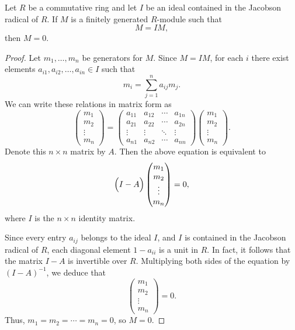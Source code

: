 \documentclass[12pt]{article}
\begin{document}
\begin{lemma}
    
Let $R$ be a commutative ring and let $I$ be an ideal contained in the Jacobson radical of $R$. If $M$ is a finitely generated $R$-module such that
$$
M = I M,
$$
then $M = 0$.

\end{lemma}

\begin{proof}

Let $m_1,\dots,m_n$ be generators for $M$. Since $M = I M$, for each $i$ there exist elements $a_{i1}, a_{i2}, \dots, a_{in} \in I$ such that
$$
m_i = \sum_{j=1}^n a_{ij} m_j.
$$
We can write these relations in matrix form as
$$
\begin{pmatrix}
m_1 \\ m_2 \\ \vdots \\ m_n
\end{pmatrix}
=
\begin{pmatrix}
a_{11} & a_{12} & \cdots & a_{1n} \\
a_{21} & a_{22} & \cdots & a_{2n} \\
\vdots & \vdots & \ddots & \vdots \\
a_{n1} & a_{n2} & \cdots & a_{nn}
\end{pmatrix}
\begin{pmatrix}
m_1 \\ m_2 \\ \vdots \\ m_n
\end{pmatrix}.
$$
Denote this $n \times n$ matrix by $A$. Then the above equation is equivalent to
$$
\Bigl(I - A\Bigr)
\begin{pmatrix}
m_1 \\ m_2 \\ \vdots \\ m_n
\end{pmatrix}
= 0,
$$
where $I$ is the $n\times n$ identity matrix.

Since every entry $a_{ij}$ belongs to the ideal $I$, and $I$ is contained in the Jacobson radical of $R$, each diagonal element $1 - a_{ii}$ is a unit in $R$. In fact, it follows that the matrix $I - A$ is invertible over $R$. Multiplying both sides of the equation by $(I-A)^{-1}$, we deduce that
$$
\begin{pmatrix}
m_1 \\ m_2 \\ \vdots \\ m_n
\end{pmatrix} = 0.
$$
Thus, $m_1 = m_2 = \cdots = m_n = 0$, so $M = 0$. 
\end{proof}
\end{document}
